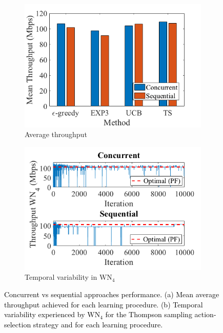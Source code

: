 \documentclass{article}
\begin{document}
	\begin{figure}[t!]
		\centering	
		\begin{subfigure}[b]{0.44\textwidth}
			\includegraphics[width=\textwidth]{images/results_part_1_async_vs_sync}
			\caption{Average throughput}
			\label{fig:results_part_1_async_vs_sync_meant_tpt}
		\end{subfigure}
		\begin{subfigure}[b]{0.44\textwidth}
			\includegraphics[width=\textwidth]{images/results_part_1_async_vs_sync_variability}
			\caption{Temporal variability in $\text{WN}_4$}
			\label{fig:results_part_1_async_vs_sync_variability}
		\end{subfigure}
		\caption{\textcolor{black}{Concurrent vs sequential approaches performance. (a) Mean average throughput achieved for each learning procedure. (b) Temporal variability experienced by $\text{WN}_4$ for the Thompson sampling action-selection strategy and for each learning procedure.}}
		\label{fig:results_part_1_async_vs_sync}
	\end{figure}
	
\end{document}
